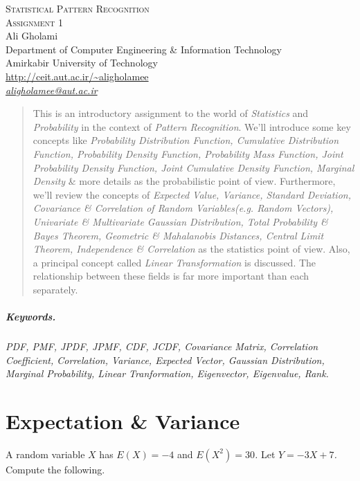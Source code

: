 \documentclass[12pt]{article}
\numberwithin{equation}{section}
\numberwithin{table}{section}
\numberwithin{figure}{section}
\begin{document}

\begin{center}
\textsc{\Large Statistical Pattern Recognition} \\[2pt]
	\textsc{\large Assignment 1}\\
	\vspace{0.5cm}
  Ali Gholami \\[6pt]
  Department of Computer Engineering \& Information Technology\\
  Amirkabir University of Technology  \\[6pt]
  \def\UrlFont{\em}
  \url{http://ceit.aut.ac.ir/~aligholamee}\\
    \href{mailto:aligholamee@aut.ac.ir}{\textit{aligholamee@aut.ac.ir}}
\end{center}

\begin{abstract}
This is an introductory assignment to the world of \textit{Statistics} and \textit{Probability} in the context of \textit{Pattern Recognition}. We'll introduce some key concepts like \textit{Probability Distribution Function, Cumulative Distribution Function, Probability Density Function, Probability Mass Function, Joint Probability Density Function, Joint Cumulative Density Function, Marginal Density} \& more details as the probabilistic point of view. Furthermore, we'll review the concepts of \textit{Expected Value, Variance, Standard Deviation, Covariance \& Correlation of Random Variables(e.g. Random Vectors), Univariate \& Multivariate Gaussian Distribution, Total Probability \& Bayes Theorem, Geometric \& Mahalanobis Distances, Central Limit Theorem, Independence \& Correlation} as the statistics point of view. Also, a principal concept called \textit{Linear Transformation} is discussed. The relationship between these fields is far more important than each separately.
\end{abstract}

\subparagraph{Keywords.} \textit{PDF, PMF, JPDF, JPMF, CDF, JCDF, Covariance Matrix, Correlation Coefficient, Correlation, Variance, Expected Vector, Gaussian Distribution, Marginal Probability, Linear Tranformation, Eigenvector, Eigenvalue, Rank.}

\section{Expectation \& Variance}

A random variable \textit{$X$} has \textit{$E(X) = -4$} and \textit{$E(X^2) = 30$.} Let \textit{$Y = -3X + 7$.} Compute the following.
\end{document}
